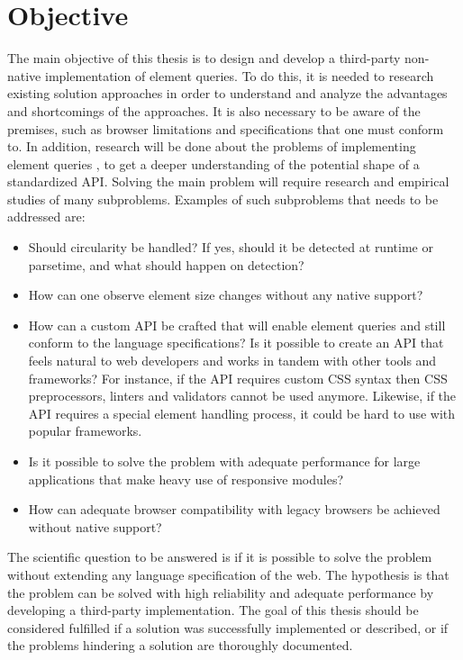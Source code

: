 \documentclass[a4paper,11pt]{kth-mag}
\begin{document}
    \section{Objective}
      The main objective of this thesis is to design and develop a \gls{third-party} non-\gls{native} implementation of element queries.
      To do this, it is needed to research existing solution approaches in order to understand and analyze the advantages and shortcomings of the approaches.
      It is also necessary to be aware of the premises, such as \gls{browser} limitations and specifications that one must conform to.
      In addition, research will be done about the problems of implementing element queries , to get a deeper understanding of the potential shape of a standardized \gls{API}.
      Solving the main problem will require research and empirical studies of many subproblems.
      Examples of such subproblems that needs to be addressed are:
      \begin{itemize}
        \item Should circularity be handled? If yes, should it be detected at runtime or parsetime, and what should happen on detection?
        \item How can one observe \gls{element} size changes without any \gls{native} support?
        \item
          How can a custom \gls{API} be crafted that will enable element queries and still conform to the language specifications? Is it possible to create an \gls{API} that feels natural to \gls{web} developers and works in tandem with other tools and frameworks?
          For instance, if the \gls{API} requires custom \gls{CSS} syntax then \gls{CSS} preprocessors, linters and validators cannot be used anymore.
          Likewise, if the \gls{API} requires a special \gls{element} handling process, it could be hard to use with popular frameworks. 
        \item Is it possible to solve the problem with adequate performance for large applications that make heavy use of responsive modules?
        \item How can adequate \gls{browser} compatibility with legacy browsers be achieved without \gls{native} support?
      \end{itemize}
      The scientific question to be answered is if it is possible to solve the problem without extending any language specification of the \gls{web}.
      The hypothesis is that the problem can be solved with high reliability and adequate performance by developing a \gls{third-party} implementation.
      The goal of this thesis should be considered fulfilled if a solution was successfully implemented or described, or if the problems hindering a solution are thoroughly documented.
\end{document}
